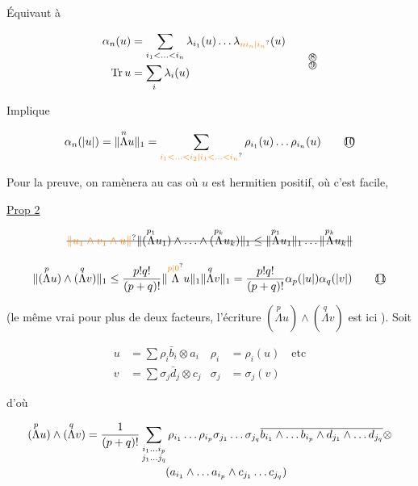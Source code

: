 Équivaut à

\[
\begin{aligned}
\alpha_n(u)&=\sum_{i_1<\ldots<i_n}\lambda_{i_1}(u)\ldots\lambda_{\unsure{n i_n|i_n}}(u)\\
\operatorname{Tr}u&=\sum_i\lambda_i(u)
\end{aligned}\tag*{$\substack{\text{\textcircled{8}}\\\text{\textcircled{9}}}$}
\]

Implique

\[
\alpha_n(|u|)=\lVert\overset{n}{\Lambda}u\rVert_1=\sum_{\unsure{i_1<\ldots<i_2|i_1<\ldots<i_n}}\rho_{i_1}(u)\ldots\rho_{i_n}(u)\tag*{\textcircled{10}}
\]


Pour la preuve, on  ramènera au cas où $u$ est hermitien positif, où c'est facile,

\uline{Prop 2}

\[
\deleted{\unsure{\lVert u_1\wedge v_1\wedge u\rVert} \lVert(\overset{p_1}{\Lambda}u_1)\wedge\ldots\wedge(\overset{p_k}{\Lambda}u_k)\rVert_1\leq\lVert\overset{p_1}{\Lambda}u_1\rVert_1\ldots\lVert\overset{p_k}{\Lambda}u_k\rVert}
\]

\[
\lVert(\overset{p}{\Lambda}u)\wedge(\overset{q}{\Lambda}v)\rVert_1\leq\frac{p!q!}{(p+q)!}\lVert\overset{\unsure{p|0}}{\Lambda}u\rVert_1\lVert\overset{q}{\Lambda}v\rVert_1=\frac{p!q!}{(p+q)!}\alpha_p(|u|)\alpha_q(|v|)\tag*{\textcircled{11}}
\]

(le même vrai pour plus de deux facteurs, l'écriture $(\overset{p}{\Lambda}u)\wedge(\overset{q}{\Lambda}v)$ est ici \uline{}).
Soit

\[
\begin{aligned}
u&=\sum\rho_i\bar b_i\otimes a_i & \rho_i&=\rho_i(u)\quad\text{etc}\\
v&=\sum\sigma_j\bar d_j\otimes c_j & \sigma_j&=\sigma_j(v)
\end{aligned}
\]

d'où

\[
\begin{aligned}
(\overset{p}{\Lambda}u)\wedge(\overset{q}{\Lambda}v)
&=\frac1{(p+q)!}\sum_{\substack{i_1\ldots i_p\\j_1\ldots j_q}}\rho_{i_1}\ldots\rho_{i_p}\sigma_{j_1}\ldots\sigma_{j_q}
\overline{b_{i_1}\wedge\ldots b_{i_p}\wedge d_{j_1}\wedge\ldots d_{j_q}}\otimes\\[-2pt]
&\hspace{25mm}(a_{i_1}\wedge\ldots a_{i_p}\wedge c_{j_1}\ldots c_{j_q})
\end{aligned}
\]

